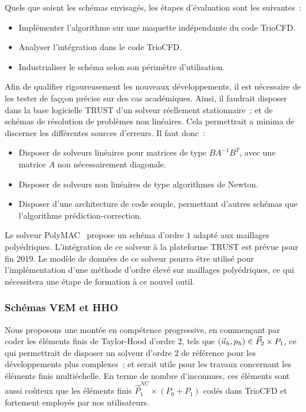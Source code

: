 Quels que soient les sch\'emas envisag\'es, les \'etapes d'\'evaluation sont les suivantes~:
\begin{itemize}
\item Impl\'ementer l'algorithme sur une maquette ind\'ependante du code TrioCFD.
\item Analyser l'int\'egration dans le code TrioCFD.
\item Industrialiser le sch\'ema selon son p\'erim\`etre d'utilisation.
\end{itemize}
Afin de qualifier rigoureusement les nouveaux d\'eveloppements, il est n\'ecessaire de les tester de fa\c cçon pr\'ecise sur des cas acad\'emiques. Ainsi, il faudrait disposer dans la base logicielle TRUST d'un solveur r\'eellement stationnaire~; et de sch\'emas de r\'esolution de probl\`emes non lin\'eaires. Cela permettrait a minima de discerner les diff\'erentes sources d'erreurs. Il faut donc~:
\begin{itemize}
\item Disposer de solveurs lin\'eaires pour matrices de type $BA^{-1}B^T$, avec une matrice $A$ non n\'ecessairement diagonale.
\item Disposer de solveurs non lin\'eaires de type algorithmes de Newton.
\item Disposer d'une architecture de code souple, permettant d'autres sch\'emas que l'algorithme pr\'ediction-correction.
\end{itemize}
Le solveur PolyMAC~\cite{Gers18} propose un sch\'ema d'ordre $1$ adapt\'e aux maillages poly\'edriques. L'int\'egration de ce solveur \`a la plateforme TRUST est pr\'evue pour fin 2019. Le mod\`ele de donn\'ees de ce solveur pourra \^etre utilis\'e pour l'impl\'ementation d'une m\'ethode d'ordre \'elev\'e sur maillages poly\'edriques, ce qui n\'ecessitera une \'etape de formation \`a ce nouvel outil.

\subsubsection{Sch\'emas VEM et HHO}


Nous proposons une mont\'ee en comp\'etence progressive, en commen\c cant par coder les \'el\'ements finis de Taylor-Hood d'ordre $2$, tels que $(\velocity_h,p_h)\in\vec{P}_2\times P_1$, ce qui permettrait de disposer un solveur d'ordre $2$ de r\'ef\'erence pour les d\'eveloppements plus complexes~; et serait utile pour les travaux concernant les \'el\'ements finis multi\'echelle. En terme de nombre d'inconnues, ces \'el\'ements sont aussi co\^uteux que les \'el\'ements finis $\vec{P}_1^{NC}\times(P_0+P_1)$ cod\'es dans TrioCFD et fortement employ\'es par nos utilisateurs.

